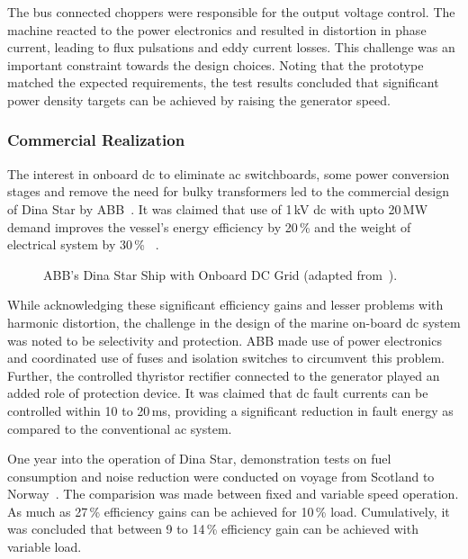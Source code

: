 \documentclass[10pt]{IETBook}
\begin{document}
The bus connected choppers were responsible for the output voltage control. The machine reacted to the power electronics and resulted in distortion in phase current, leading to flux pulsations and eddy current losses. This challenge was an important constraint towards the design choices. Noting that the prototype matched the expected requirements, the test results concluded that significant power density targets can be achieved by raising the generator speed.
\subsubsection{Commercial Realization}
The interest in onboard dc to eliminate ac switchboards, some power conversion stages and remove the need for bulky transformers led to the commercial design of Dina Star by ABB~\cite{abb1}. It was claimed that use of 1\,kV dc with upto 20\,MW demand improves the vessel's energy efficiency by 20\,\% and the weight of electrical system by 30\,\% ~\cite{abbart,abb0}.
\begin{figure}[!h]
\centerline{}
\caption{ABB's Dina Star Ship with Onboard DC Grid  (adapted from~\cite{abb1}).}
\label{figdina}
\end{figure}

While acknowledging these significant efficiency gains and lesser problems with harmonic distortion, the challenge in the design of the marine on-board dc system was noted to be selectivity and protection. ABB made use of power electronics and coordinated use of fuses and isolation switches to circumvent this problem. Further, the controlled thyristor rectifier connected to the generator played an added role of protection device. It was claimed that dc fault currents can be controlled within 10 to 20\,ms, providing a significant reduction in fault energy as compared to the conventional ac system.

One year into the operation of Dina Star, demonstration tests on fuel consumption and noise reduction were conducted on voyage from Scotland to Norway~\cite{abb1}. The comparision was made between fixed and variable speed operation. As much as 27\,\% efficiency gains can be achieved for 10\,\% load. Cumulatively, it was concluded that between 9 to 14\,\%  efficiency gain can be achieved with variable load.
\end{document}
